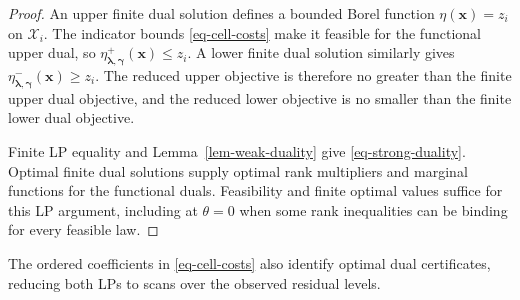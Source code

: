 \documentclass[review,11pt,3p,authoryear,nopreprintline]{elsarticle}
\begin{document}
\begin{proof}
  An upper finite dual solution defines a bounded Borel function $\eta(\bm x)=z_i$ on $\mathcal X_i$. The indicator bounds \eqref{eq-cell-costs} make it feasible for the functional upper dual, so $\eta^+_{\bm\lambda,\bm\gamma}(\bm x)\le z_i$. A lower finite dual solution similarly gives $\eta^-_{\bm\lambda,\bm\gamma}(\bm x)\ge z_i$. The reduced upper objective is therefore no greater than the finite upper dual objective, and the reduced lower objective is no smaller than the finite lower dual objective.

  Finite LP equality and Lemma~\ref{lem-weak-duality} give \eqref{eq-strong-duality}. Optimal finite dual solutions supply optimal rank multipliers and marginal functions for the functional duals. Feasibility and finite optimal values suffice for this LP argument, including at $\theta=0$ when some rank inequalities can be binding for every feasible law.
\end{proof}

The ordered coefficients in \eqref{eq-cell-costs} also identify optimal dual certificates, reducing both LPs to scans over the observed residual levels.
\end{document}
